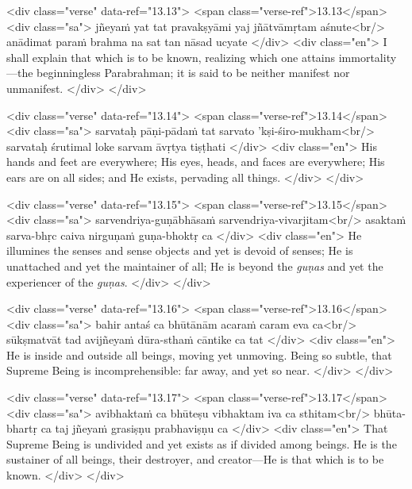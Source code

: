 \begin{html}
<div class="verse" data-ref="13.13">
  <span class="verse-ref">13.13</span>
  <div class="sa">
    jñeyaṁ yat tat pravakṣyāmi yaj jñātvāmṛtam aśnute<br/>
    anādimat paraṁ brahma na sat tan nāsad ucyate
  </div>
  <div class="en">
    I shall explain that which is to be known, realizing which one attains immortality---the beginningless Parabrahman; it is said to be neither manifest nor unmanifest.
  </div>
</div>
\end{html}



\begin{html}
<div class="verse" data-ref="13.14">
  <span class="verse-ref">13.14</span>
  <div class="sa">
    sarvataḥ pāṇi-pādaṁ tat sarvato ’kṣi-śiro-mukham<br/>
    sarvataḥ śrutimal loke sarvam āvṛtya tiṣṭhati
  </div>
  <div class="en">
    His hands and feet are everywhere; His eyes, heads, and faces are everywhere; His ears are on all sides; and He exists, pervading all things.
  </div>
</div>
\end{html}



\begin{html}
<div class="verse" data-ref="13.15">
  <span class="verse-ref">13.15</span>
  <div class="sa">
    sarvendriya-guṇābhāsaṁ sarvendriya-vivarjitam<br/>
    asaktaṁ sarva-bhṛc caiva nirguṇaṁ guṇa-bhoktṛ ca
  </div>
  <div class="en">
    He illumines the senses and sense objects and yet is devoid of senses; He is unattached and yet the maintainer of all; He is beyond the \textit{guṇas} and yet the experiencer of the \textit{guṇas}.
  </div>
</div>
\end{html}



\begin{html}
<div class="verse" data-ref="13.16">
  <span class="verse-ref">13.16</span>
  <div class="sa">
    bahir antaś ca bhūtānām acaraṁ caram eva ca<br/>
    sūkṣmatvāt tad avijñeyaṁ dūra-sthaṁ cāntike ca tat
  </div>
  <div class="en">
    He is inside and outside all beings, moving yet unmoving. Being so subtle, that Supreme Being is incomprehensible: far away, and yet so near.
  </div>
</div>
\end{html}



\begin{html}
<div class="verse" data-ref="13.17">
  <span class="verse-ref">13.17</span>
  <div class="sa">
    avibhaktaṁ ca bhūteṣu vibhaktam iva ca sthitam<br/>
    bhūta-bhartṛ ca taj jñeyaṁ grasiṣṇu prabhaviṣṇu ca
  </div>
  <div class="en">
    That Supreme Being is undivided and yet exists as if divided among beings. He is the sustainer of all beings, their destroyer, and creator---He is that which is to be known.
  </div>
</div>
\end{html}



